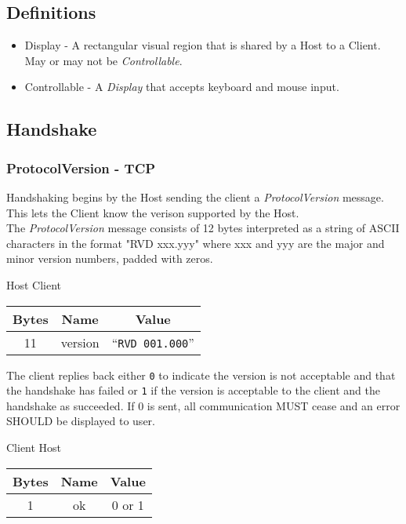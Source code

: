 \documentclass{article}
\begin{document}
    \subsection{Definitions}

    \begin{itemize}
        \item Display - A rectangular visual region that is shared by a Host to a Client. May or may not be \emph{Controllable}.
        \item Controllable - A \emph{Display} that accepts keyboard and mouse input.
    \end{itemize}

    \subsection{Handshake}

    \subsubsection{ProtocolVersion - TCP}
    Handshaking begins by the Host sending the client a \emph{ProtocolVersion} message. This lets the Client know the verison supported by the Host.\\

    The \emph{ProtocolVersion} message consists of 12 bytes interpreted as a string of ASCII characters in the format "RVD xxx.yyy" where xxx and yyy are the major and minor version numbers, padded with zeros.

    \begin{center}
        Host \textrightarrow Client\\
        \begin{tabular}{|c|c|c|}
            \hline
            \textbf{Bytes} & \textbf{Name} & \textbf{Value}           \\
            \hline
            11             & version       & ``\texttt{RVD 001.000}'' \\
            \hline
        \end{tabular}
    \end{center}

    The client replies back either \texttt{0} to indicate the version is not acceptable and that the handshake has failed or \texttt{1} if the version is acceptable to the client and the handshake as succeeded. If 0 is sent, all communication MUST cease and an error SHOULD be displayed to user.

    \begin{center}
        Client \textrightarrow Host\\
        \begin{tabular}{|c|c|c|}
            \hline
            \textbf{Bytes} & \textbf{Name} & \textbf{Value} \\
            \hline
            1              & ok            & 0 or 1         \\
            \hline
        \end{tabular}
    \end{center}
\end{document}
